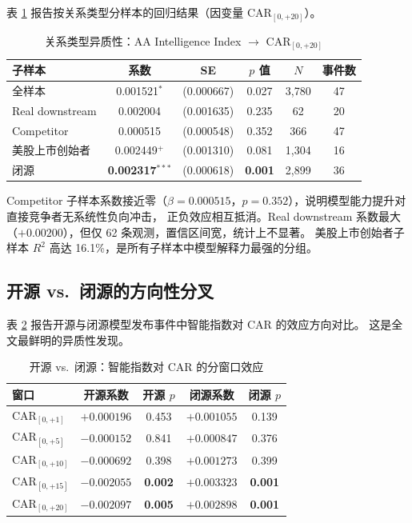 \documentclass[11pt,fontset=fandol,a4paper]{ctexart}
\begin{document}
表 \ref{tab:rel_het} 报告按关系类型分样本的回归结果（因变量 $\text{CAR}_{[0,+20]}$）。

\begin{table}[htbp]
\centering
\caption{关系类型异质性：AA Intelligence Index $\rightarrow$ $\text{CAR}_{[0,+20]}$}
\label{tab:rel_het}
\small
\begin{tabular}{lccccc}
\toprule
子样本 & 系数 & SE & $p$ 值 & $N$ & 事件数 \\
\midrule
全样本          & 0.001521$^{*}$  & (0.000667) & 0.027  & 3{,}780 & 47 \\
Real downstream & 0.002004        & (0.001635) & 0.235  & 62      & 20 \\
Competitor      & 0.000515        & (0.000548) & 0.352  & 366     & 47 \\
美股上市创始者  & 0.002449$^{+}$  & (0.001310) & 0.081  & 1{,}304 & 16 \\
闭源            & \textbf{0.002317$^{***}$} & (0.000618) & \textbf{0.001} & 2{,}899 & 36 \\
\bottomrule
\end{tabular}
\end{table}

Competitor 子样本系数接近零（$\beta=0.000515$，$p=0.352$），说明模型能力提升对直接竞争者无系统性负向冲击，
正负效应相互抵消。Real downstream 系数最大（$+0.00200$），但仅 62 条观测，置信区间宽，统计上不显著。
美股上市创始者子样本 $R^2$ 高达 16.1\%，是所有子样本中模型解释力最强的分组。

\subsection{开源 vs.\ 闭源的方向性分叉}

表 \ref{tab:open_closed} 报告开源与闭源模型发布事件中智能指数对 CAR 的效应方向对比。
这是全文最鲜明的异质性发现。

\begin{table}[htbp]
\centering
\caption{开源 vs.\ 闭源：智能指数对 CAR 的分窗口效应}
\label{tab:open_closed}
\small
\begin{tabular}{lcccc}
\toprule
窗口 & 开源系数 & 开源 $p$ & 闭源系数 & 闭源 $p$ \\
\midrule
$\text{CAR}_{[0,+1]}$  & $+0.000196$ & 0.453 & $+0.001055$ & 0.139 \\
$\text{CAR}_{[0,+5]}$  & $-0.000152$ & 0.841 & $+0.000847$ & 0.376 \\
$\text{CAR}_{[0,+10]}$ & $-0.000692$ & 0.398 & $+0.001273$ & 0.399 \\
$\text{CAR}_{[0,+15]}$ & \textbf{$-0.002055$} & \textbf{0.002} & \textbf{$+0.003323$} & \textbf{0.001} \\
$\text{CAR}_{[0,+20]}$ & \textbf{$-0.002097$} & \textbf{0.005} & \textbf{$+0.002898$} & \textbf{0.001} \\
\bottomrule
\end{tabular}
\end{table}
\end{document}
